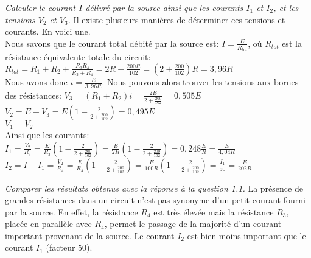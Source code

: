 

{%
\textit{Calculer le courant $I$ délivré par la source ainsi que les courants $I_1$ et $I_2$, et les tensions $V_2$ et $V_3$.}
}
{%
Il existe plusieurs manières de déterminer ces tensions et courants. En voici une.\\
Nous savons que le courant total débité par la source est: $I=\frac{E}{R_{tot}}$, où $R_{tot}$ est la résistance équivalente totale du circuit:\\
$R_{tot}=R_1+R_2+\frac{R_3 R_4}{R_3+R_4}=2R+\frac{200R}{102}=(2+\frac{200}{102})R=3,96R$\\
Nous avons donc $i=\frac{E}{3,96R}$.
Nous pouvons alors trouver les tensions aux bornes des résistances:
$V_3=(R_1+R_2)i=\frac{2E}{2+\frac{200}{102}}=0,505E$\\
$V_2=E-V_3=E(1-\frac{2}{2+\frac{200}{102}})=0,495E$\\
$V_1=V_2$\\
Ainsi que les courants:\\
$I_1=\frac{V_2}{R_3}=\frac{E}{R_3}(1-\frac{2}{2+\frac{200}{102}})=\frac{E}{2R}(1-\frac{2}{2+\frac{200}{102}})=0,248\frac{E}{R}=\frac{E}{4,04R}$\\
$I_2=I-I_1=\frac{V_2}{R_4}=\frac{E}{R_4}(1-\frac{2}{2+\frac{200}{102}})=\frac{E}{100R}(1-\frac{2}{2+\frac{200}{102}})=\frac{I_1}{50}=\frac{E}{202R}$
}

{%
\textit{Comparer les résultats obtenus avec la réponse à la question 1.1.}
}
{%
La présence de grandes résistances dans un circuit n'est pas synonyme d'un petit courant fourni par la source. En effet, la résistance $R_4$ est très élevée mais la résistance $R_3$, placée en parallèle avec $R_4$, permet le passage de la majorité d'un courant important provenant de la source. Le courant $I_2$ est bien moins important que le courant $I_1$ (facteur $50$).
}

